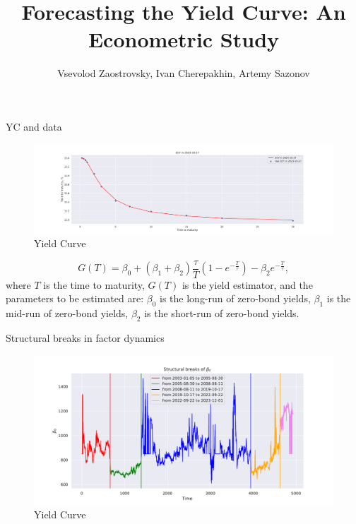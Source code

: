 \documentclass[aspectratio=169]{beamer}
\title{Forecasting the Yield Curve: An Econometric Study}
\subtitle{}
\author{Vsevolod Zaostrovsky, Ivan Cherepakhin, Artemy Sazonov}
\institute{Lomonosov Moscow State University}
\begin{document}
\maketitle

\begin{frame}{YC and data}
    \begin{figure}
        \includegraphics[scale=0.21]{fig/ZCYp.pdf}
        \caption{Yield Curve }
        \label{fig:YTMp}
    \end{figure}
    \begin{equation}\label{eq:NS}
        G(T) = \beta_0 + (\beta_1+\beta_2)\frac{\tau}{T}\left(1-e^{-\frac{T}{\tau}}\right)-\beta_2  e^{-\frac{T}{\tau}},
    \end{equation}
    where $T$ is the time to maturity, $G(T)$ is the yield estimator, 
    and the parameters to be estimated are: $\beta_0$ is the long-run of zero-bond yields, $\beta_1$ is the mid-run of zero-bond yields, 
    $\beta_2$ is the short-run of zero-bond yields.
    
\end{frame}

\begin{frame}{Structural breaks in factor dynamics}

    \begin{figure}
        \includegraphics[scale=0.43]{fig/StrBreaks.pdf}
        \caption{Yield Curve }
        \label{fig:StrBreaks}
    \end{figure}
\end{frame}
\end{document}
